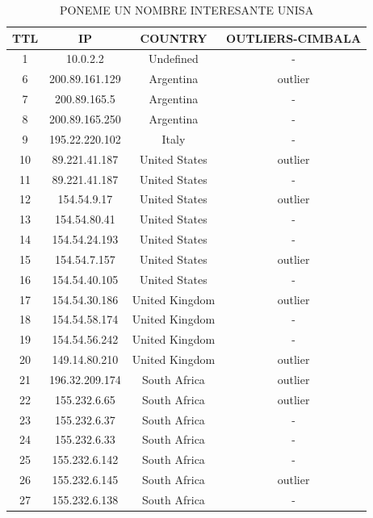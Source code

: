 \begin{table}[!htbp]
\centering
\caption{PONEME UN NOMBRE INTERESANTE UNISA}
\label{tabla-unisa}
\begin{tabular}{|c|c|c|c|}
\hline
\textbf{TTL} & \textbf{IP}     & \textbf{COUNTRY} & \textbf{OUTLIERS-CIMBALA} \\ \hline

  1	&	10.0.2.2			&	Undefined        &   	-\\ \hline
  6	&	200.89.161.129	&	Argentina        &   	outlier\\ \hline
  7	&	200.89.165.5		&	Argentina        &   	-\\ \hline
  8	&	200.89.165.250	&	Argentina        &   	-\\ \hline
  9	&	195.22.220.102	&	Italy            &   	-\\ \hline
 10	&	89.221.41.187	&	United States    &   	outlier\\ \hline
 11	&	89.221.41.187	&	United States    &   	-\\ \hline
 12	&	154.54.9.17		&	United States    &   	outlier\\ \hline
 13	&	154.54.80.41		&	United States    &   	-\\ \hline
 14	&	154.54.24.193	&	United States    &   	-\\ \hline
 15	&	154.54.7.157		&	United States    &   	outlier\\ \hline
 16	&	154.54.40.105	&	United States    &   	-\\ \hline
 17	&	154.54.30.186	&	United Kingdom   &   	outlier\\ \hline
 18	&	154.54.58.174	&	United Kingdom   &   	-\\ \hline
 19	&	154.54.56.242	&	United Kingdom   &   	-\\ \hline
 20	&	149.14.80.210	&	United Kingdom   &   	outlier\\ \hline
 21	&	196.32.209.174	&	South Africa     &   	outlier\\ \hline
 22	&	155.232.6.65		&	South Africa     &   	outlier\\ \hline
 23	&	155.232.6.37		&	South Africa     &   	-\\ \hline
 24	&	155.232.6.33		&	South Africa     &   	-\\ \hline
 25	&	155.232.6.142	&	South Africa     &   	-\\ \hline
 26	&	155.232.6.145	&	South Africa     &   	outlier\\ \hline
 27	&	155.232.6.138	&	South Africa     &   	-\\ \hline


\end{tabular}
\end{table}

